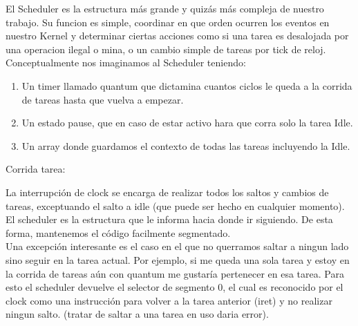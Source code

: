 El Scheduler es la estructura m\'as grande y quiz\'as m\'as compleja de nuestro trabajo. Su funcion es simple, coordinar en 
que orden ocurren los eventos en nuestro Kernel y determinar ciertas acciones como si una tarea es desalojada por una operacion ilegal o mina, o un cambio simple de tareas por tick de reloj.\\
Conceptualmente nos imaginamos al Scheduler teniendo:
\begin{enumerate}
 \item Un timer llamado quantum que dictamina cuantos ciclos le queda a la corrida de tareas hasta que vuelva a empezar.
 \item Un estado pause, que en caso de estar activo hara que corra solo la tarea Idle.
 \item Un array donde guardamos el contexto de todas las tareas incluyendo la Idle.
\end{enumerate}

Corrida tarea:\\
\begin{center}
\end{center}

\begin{center}
\end{center}


La interrupci\'on de clock se encarga de realizar todos los saltos y cambios de tareas, exceptuando el salto a idle (que puede ser hecho 
en cualquier momento). El scheduler es la estructura que le informa hacia donde ir siguiendo. De esta forma, mantenemos el c\'odigo facilmente 
segmentado.\\

Una excepci\'on interesante es el caso en el que no querramos saltar a ningun lado sino seguir en la tarea actual. Por ejemplo, si me 
queda una sola tarea y estoy en la corrida de tareas a\'un con quantum me gustar\'ia pertenecer en esa tarea. Para esto el scheduler 
devuelve el selector de segmento 0, el cual es reconocido por el clock como una instrucci\'on para volver a la tarea anterior (iret) 
y no realizar ningun salto. (tratar de saltar a una tarea en uso daria error).
